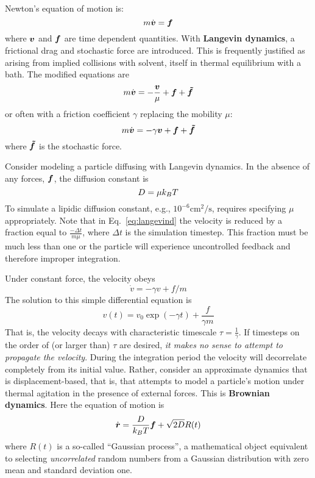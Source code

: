 
 \label{sec:timescales}


Newton's equation of motion is:
\begin{equation}
m \dot{\boldsymbol{v}} = \boldsymbol{f}
\end{equation}
where $\boldsymbol{v}$ and $\boldsymbol{f}$ are time dependent quantities.
With {\bf Langevin dynamics}, a frictional drag and stochastic force are introduced.
This is frequently justified as arising from implied collisions with solvent, itself in thermal equilibrium with a bath.
The modified equations are
\begin{equation}
m \dot{\boldsymbol{v}} = -\frac{\boldsymbol{v}}{\mu} + \boldsymbol{f} + \boldsymbol{\tilde{f}}
\end{equation}
or often with a friction coefficient $\gamma$ replacing the mobility $\mu$:
\begin{equation}
\label{eq:langevind}
m \dot{\boldsymbol{v}} = -\gamma \boldsymbol{v} + \boldsymbol{f} + \boldsymbol{\tilde{f}}
\end{equation}
where $\boldsymbol{\tilde{f}}$ is the stochastic force.

Consider modeling a particle diffusing with Langevin dynamics.
In the absence of any forces, $\boldsymbol{f}$, the diffusion constant is
\begin{equation}
D = \mu k_B T
\end{equation}
To simulate a lipidic diffusion constant, e.g., $10^{-6} \textrm{cm}^2/\textrm{s}$, requires specifying $\mu$ appropriately.
Note that in Eq.~\ref{eq:langevind} the velocity is reduced by a fraction equal to $\frac{-\Delta t}{m \mu}$,
where $\Delta t$ is the simulation timestep.
This fraction must be much less than one or the particle will experience uncontrolled feedback and therefore improper integration.


Under constant force, the velocity obeys
\begin{equation}
\dot{v} = -\gamma v + f/m
\end{equation}
The solution to this simple differential equation is
\begin{equation}
v(t) = v_0 \exp(-\gamma t) + \frac{f}{\gamma m}
\end{equation}
That is, the velocity decays with characteristic timescale $\tau=\frac{1}{\gamma}$.
If timesteps on the order of (or larger than) $\tau$ are desired, {\it it makes no sense to attempt to propagate the velocity}.
During the integration period the velocity will decorrelate completely from its initial value.
Rather, consider an approximate dynamics that is displacement-based, that is, that attempts to model a particle's motion under thermal agitation in the presence of external forces.
This is {\bf Brownian dynamics}. 
Here the equation of motion is 
\begin{equation}
\dot{\boldsymbol{r}} = \frac{D}{k_B T} \boldsymbol{f} + \sqrt{2 D} R(t)
\end{equation}
where $R(t)$ is a so-called ``Gaussian process'', a mathematical object equivalent to selecting {\it uncorrelated} random numbers from a Gaussian distribution with zero mean and standard deviation one.


